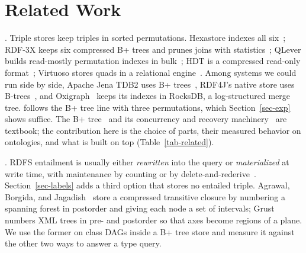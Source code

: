 \section{Related Work}
\label{sec-related}

.
Triple stores keep triples in sorted permutations.
Hexastore indexes all six~\cite{weiss2008}; RDF-3X keeps six compressed B+
trees and prunes joins with statistics~\cite{neumann2010}; QLever builds
read-mostly permutation indexes in bulk~\cite{bast2017}; HDT is a compressed
read-only format~\cite{fernandez2013}; Virtuoso stores quads in a relational
engine~\cite{erling2010}.
Among systems we could run side by side, Apache Jena TDB2 uses B+
trees~\cite{jenatdb}, RDF4J's native store uses B-trees~\cite{rdf4j}, and
Oxigraph~\cite{oxigraph} keeps its indexes in RocksDB, a log-structured merge
tree.
\sys follows the B+ tree line with three permutations, which
Section~\ref{sec-exp} shows suffice.
The B+ tree~\cite{bayer1972,comer1979} and its concurrency and recovery
machinery~\cite{lehman1981,graefe2011,mohan1992} are textbook; the
contribution here is the choice of parts, their measured behavior on
ontologies, and what is built on top (Table~\ref{tab-related}).

\begin{table}[t]
\caption{Stores for ontologies, as documented (October 2026). We ran \sys, Oxigraph, Jena TDB2, and SQLite.}
\label{tab-related}
\small
{}
\end{table}

.
RDFS entailment is usually either \emph{rewritten} into the query or
\emph{materialized} at write time, with maintenance by counting or by
delete-and-rederive~\cite{gupta1993}.
Section~\ref{sec-labels} adds a third option that stores no entailed triple.
Agrawal, Borgida, and Jagadish~\cite{agrawal1989} store a compressed
transitive closure by numbering a spanning forest in postorder and giving each
node a set of intervals; Grust~\cite{grust2002} numbers XML trees in pre- and
postorder so that axes become regions of a plane.
We use the former on class DAGs inside a B+ tree store and measure it against
the other two ways to answer a type query.

